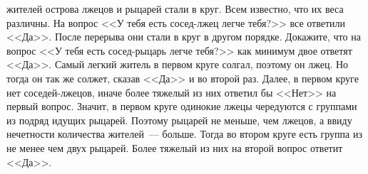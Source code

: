  жителей острова лжецов и рыцарей стали в круг.
Всем известно, что их веса различны.
На вопрос <<У тебя есть сосед-лжец легче тебя?>> все ответили <<Да>>.
После перерыва они стали в круг в другом порядке.
Докажите, что на вопрос <<У тебя есть сосед-рыцарь легче тебя?>> как минимум
двое ответят <<Да>>.
\solution
Самый легкий житель в первом круге солгал, поэтому он лжец.
Но тогда он так же солжет, сказав <<Да>> и во второй раз.
Далее, в первом круге нет соседей-лжецов, иначе более тяжелый из них ответил бы
<<Нет>> на первый вопрос.
Значит, в первом круге одинокие лжецы чередуются с группами из подряд идущих
рыцарей.
Поэтому рыцарей не меньше, чем лжецов, а ввиду нечетности количества
жителей~--- больше.
Тогда во втором круге есть группа из не менее чем двух рыцарей.
Более тяжелый из них на второй вопрос ответит <<Да>>.
\endproblem
